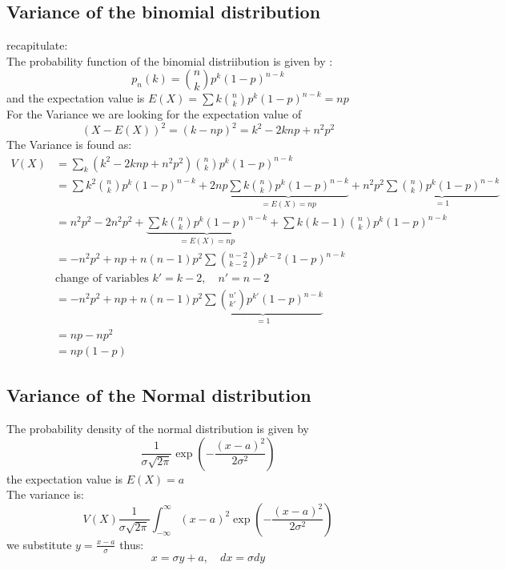 \documentclass[a4paper,10pt]{article}
\begin{document}
\subsection{Variance of the binomial distribution}
\label{sub:variance_of_the_binomial_distribution}
recapitulate:\\
The probability function of the binomial distriibution is given by :
\begin{equation*}
  p_n(k)=\binom{n}{k}p^k(1-p)^{n-k}
\end{equation*}
and the  expectation value is  $E(X)=\sum k \binom{n}{k}p^k(1-p)^{n-k}=np$\\
For the Variance we are looking for the expectation value of
\begin{equation*}
  (X-E(X))^2= (k-np)^2= k^2-2knp +n^2p^2
\end{equation*}
The  Variance is found as:
\begin{equation}
  \begin{split}
  V(X)&= \sum_{k} (k^2-2knp+n^2p^2) \binom{n}{k}p^k(1-p)^{n-k}\\
  &= \sum k^2 \binom{n}{k}p^k(1-p)^{n-k} + 2np\underbrace{   \sum k\binom{n}{k}p^k(1-p)^{n-k}}_{= E(X)=np}+ n^2p^2\underbrace{ \sum \binom{n}{k}p^k(1-p)^{n-k}}_{=1}\\
  &=  n^2p^2 -2n^2p^2 +  \underbrace{\sum k \binom{n}{k}p^k(1-p)^{n-k}}_{=E(X)=np} +\sum k(k-1)\binom{n}{k}p^{k}(1-p)^{n-k}\\
  &=  - n^2p^2 + np + n(n-1)p^2 \sum \binom{n-2}{k-2}p^{k-2}(1-p)^{n-k}\\
  &\textrm{change of variables } k'=k-2, \quad n'=n-2\\
  &=  - n^2p^2 +np + n(n-1)p^2 \underbrace{\sum \binom{n'}{k'}p^{k'}(1-p)^{n-k}}_{=1}\\
  &= np-np^2 \\
  &=np(1-p)
  \end{split}
\end{equation}
\subsection{Variance of the Normal distribution}
\label{sub:variance_of_the_normal_distribution}
The probability density of the normal distribution is given by 
\begin{equation*}
  \frac{1}{\sigma \sqrt{2\pi}} \exp(-\frac{(x-a)^2}{2\sigma ^2})
\end{equation*}
the expectation value is $E(X)=a$\\
The variance is:
\begin{equation}
  V(X)\frac{1}{\sigma \sqrt{2\pi}}\int_{-\infty}^{\infty}(x-a)^2 \exp(-\frac{(x-a)^2}{2\sigma ^2})
\end{equation}
we substitute
    $y=\frac{x-a}{\sigma }$    thus:
    \begin{equation}
      x=\sigma y+a , \quad dx=\sigma dy
    \end{equation}
\end{document}
